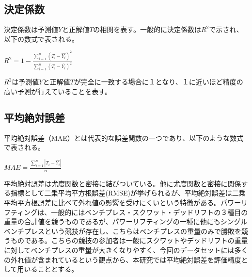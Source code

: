 \documentclass{article}
\begin{document}
\subsection{決定係数}

決定係数は予測値\begin{math}Y\end{math}と正解値\begin{math}T\end{math}の相関を表す。一般的に決定係数は\begin{math}R^2\end{math}で示され、以下の数式で表される。

\begin{center}
\begin{math}R^2=1-\frac{\sum_{i=1}^{n}(T_i-\hat{Y_i})^2}{\sum_{i=1}^{n}(T_i-\bar{Y_i})^2}\end{math}
\end{center}

\begin{math}R^2\end{math}は予測値\begin{math}Y\end{math}と正解値\begin{math}T\end{math}が完全に一致する場合に１となり、１に近いほど精度の高い予測が行えていることを表す。


\subsection{平均絶対誤差}

平均絶対誤差（MAE）とは代表的な誤差関数の一つであり、以下のような数式で表される。

\begin{center}
\begin{math}
MAE = \frac{\sum_{i=1}^{n}|T_i-\hat{Y_i}|}{n} 
\end{math}
\end{center}

平均絶対誤差は尤度関数と密接に結びついている。他に尤度関数と密接に関係する指標として二乗平均平方根誤差(RMSE)が挙げられるが、平均絶対誤差は二乗平均平方根誤差に比べて外れ値の影響を受けにくいという特徴がある。パワーリフティングは、一般的にはベンチプレス・スクワット・デッドリフトの３種目の重量の合計値を競うものであるが、パワーリフティングの一種に他にもシングルベンチプレスという競技が存在し、こちらはベンチプレスの重量のみで勝敗を競うものである。こちらの競技の参加者は一般にスクワットやデッドリフトの重量に対してベンチプレスの重量が大きくなりやすく、今回のデータセットには多くの外れ値が含まれているという観点から、本研究では平均絶対誤差を評価精度として用いることとする。
\end{document}
